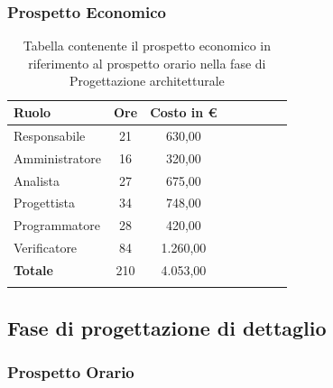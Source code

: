 \documentclass[../piano_di_progetto.tex]{subfiles}
\begin{document}
\subsubsection{Prospetto Economico}

\begin{center}
	\begin{longtable}{|l|c|c|c|c|c|c|c|}
		\hline
		\rowcolor{lightgray}
		\textbf{Ruolo} & \textbf{Ore} & \textbf{Costo in €}\\

		\hline
		Responsabile & 21 & 630,00\\
		\hline
		Amministratore & 16 & 320,00\\
		\hline
		Analista & 27 & 675,00\\
		\hline
		Progettista & 34 & 748,00\\
		\hline
		Programmatore & 28 & 420,00\\
		\hline
		Verificatore & 84 & 1.260,00\\
		\hline
		\textbf{Totale} & 210 & 4.053,00\\
		\hline
		\caption{Tabella contenente il prospetto economico in riferimento al prospetto orario nella fase di Progettazione architetturale}
	\end{longtable}
\end{center}

\subsection{ Fase di progettazione di dettaglio}%
\label{sub:fase_prog_dett}
\subsubsection{Prospetto Orario}
\end{document}
